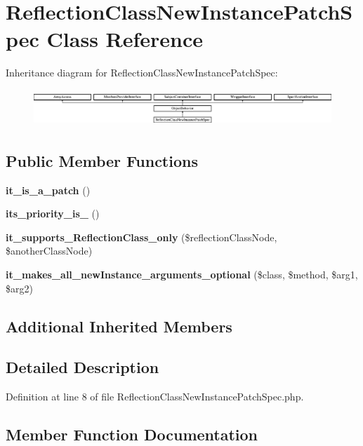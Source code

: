 \section{Reflection\+Class\+New\+Instance\+Patch\+Spec Class Reference}
\label{classspec_1_1_prophecy_1_1_doubler_1_1_class_patch_1_1_reflection_class_new_instance_patch_spec}
Inheritance diagram for Reflection\+Class\+New\+Instance\+Patch\+Spec\+:\begin{figure}[H]
\begin{center}
\leavevmode
\includegraphics[height=1.400000cm]{classspec_1_1_prophecy_1_1_doubler_1_1_class_patch_1_1_reflection_class_new_instance_patch_spec}
\end{center}
\end{figure}
\subsection*{Public Member Functions}
\begin{DoxyCompactItemize}
\item 
{\bf it\+\_\+is\+\_\+a\+\_\+patch} ()
\item 
{\bf its\+\_\+priority\+\_\+is\+\_} ()
\item 
{\bf it\+\_\+supports\+\_\+\+Reflection\+Class\+\_\+only} (\$reflection\+Class\+Node, \$another\+Class\+Node)
\item 
{\bf it\+\_\+makes\+\_\+all\+\_\+new\+Instance\+\_\+arguments\+\_\+optional} (\$class, \$method, \$arg1, \$arg2)
\end{DoxyCompactItemize}
\subsection*{Additional Inherited Members}


\subsection{Detailed Description}


Definition at line 8 of file Reflection\+Class\+New\+Instance\+Patch\+Spec.\+php.



\subsection{Member Function Documentation}
